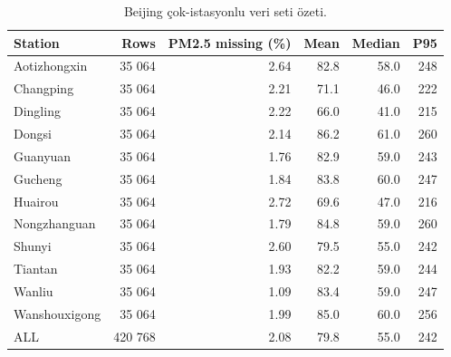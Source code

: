 \begin{table}[t]
\caption{Beijing çok-istasyonlu veri seti özeti.}
\label{tab:dataset}
\centering\footnotesize
\begin{tabular}{lrrrrr}
\toprule
Station & Rows & PM2.5 missing (\%) & Mean & Median & P95 \\
\midrule
Aotizhongxin & 35 064 & 2.64 & 82.8 & 58.0 & 248 \\
Changping & 35 064 & 2.21 & 71.1 & 46.0 & 222 \\
Dingling & 35 064 & 2.22 & 66.0 & 41.0 & 215 \\
Dongsi & 35 064 & 2.14 & 86.2 & 61.0 & 260 \\
Guanyuan & 35 064 & 1.76 & 82.9 & 59.0 & 243 \\
Gucheng & 35 064 & 1.84 & 83.8 & 60.0 & 247 \\
Huairou & 35 064 & 2.72 & 69.6 & 47.0 & 216 \\
Nongzhanguan & 35 064 & 1.79 & 84.8 & 59.0 & 260 \\
Shunyi & 35 064 & 2.60 & 79.5 & 55.0 & 242 \\
Tiantan & 35 064 & 1.93 & 82.2 & 59.0 & 244 \\
Wanliu & 35 064 & 1.09 & 83.4 & 59.0 & 247 \\
Wanshouxigong & 35 064 & 1.99 & 85.0 & 60.0 & 256 \\
ALL & 420 768 & 2.08 & 79.8 & 55.0 & 242 \\
\bottomrule
\end{tabular}
\end{table}
